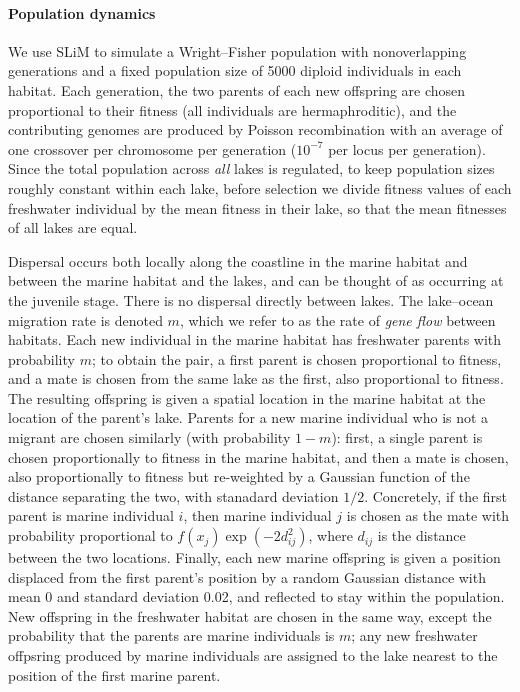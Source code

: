 \documentclass{article}
\begin{document}
\paragraph{Population dynamics}
We use SLiM to simulate a Wright--Fisher population with nonoverlapping generations 
and a fixed population size of 5000 diploid individuals in each habitat.
Each generation, the two parents of each new offspring are chosen proportional to their fitness 
(all individuals are hermaphroditic),
and the contributing genomes are produced by Poisson recombination with an average of one crossover per chromosome per generation 
($10^{-7}$ per locus per generation). 
Since the total population across \emph{all} lakes is regulated,
to keep population sizes roughly constant within each lake, 
before selection we divide fitness values of each freshwater individual by the mean fitness in their lake,
so that the mean fitnesses of all lakes are equal.

Dispersal occurs both locally along the coastline in the marine habitat 
and between the marine habitat and the lakes, and can be thought of as occurring at the juvenile stage. 
There is no dispersal directly between lakes.
The lake--ocean migration rate is denoted $m$, 
which we refer to as the rate of \emph{gene flow} between habitats.
Each new individual in the marine habitat has freshwater parents with probability $m$; 
to obtain the pair, a first parent is chosen proportional to fitness, and a mate is chosen from the same lake as the first, also proportional to fitness. 
The resulting offspring is given a spatial location in the marine habitat at the location of the parent's lake. 
Parents for a new marine individual who is not a migrant are chosen similarly (with probability $1-m$): 
first, a single parent is chosen proportionally to fitness in the marine habitat,
and then a mate is chosen, also proportionally to fitness but re-weighted by a Gaussian function of the distance separating the two, with stanadard deviation $1/2$. 
Concretely, if the first parent is marine individual $i$, then marine individual $j$ is chosen as the mate with probability proportional to $f(x_j) \exp(-2d_{ij}^2)$,
where $d_{ij}$ is the distance between the two locations. 
Finally, each new marine offspring is given a position displaced from the first parent's position by a random Gaussian distance with mean 0 and standard deviation 0.02, 
and reflected to stay within the population.
New offspring in the freshwater habitat are chosen in the same way, except the probability that the parents are marine individuals is $m$; 
any new freshwater offpsring produced by marine individuals are assigned to the lake nearest to the position of the first marine parent.
\end{document}
